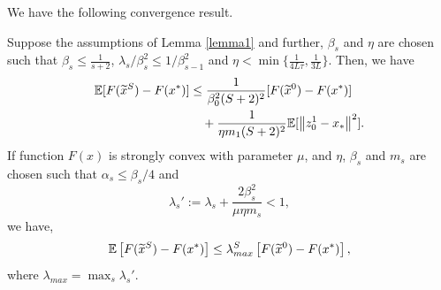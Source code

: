 We have the following convergence result.
\begin{theorem}\label{conve-theorem}
Suppose the assumptions of Lemma \ref{lemma1} and further, $\beta_s$ and $\eta$ are chosen such that $\beta_s\leq \frac{1}{s+2}$,  $\lambda_s/\beta_s^2 \leq 1/\beta_{s-1}^2$ and $\eta < \min\{\frac{1}{4L
\tau}, \frac{1}{3L}\}$. 
Then, we have
\begin{equation}
\begin{split}
{\mathbb{E}[F(\widetilde{x}^S)-F(x^*)]}&\leq \frac{1}{\beta_{0}^2(S+2)^2}[F(\widetilde{x}^{0})-F(x^*)] \\ 
&~~~ + {\frac{1}{\eta m_{1}(S+2)^2}}\mathbb{E}[\left\lVert z_{0}^1-x_*\right\rVert^2].
\end{split}
\end{equation}
If function $F(x)$ is strongly convex with parameter $\mu$, and $\eta$, $\beta_s$ and $m_s$ are chosen such that $\alpha_s\leq \beta_s/4$ and
\[
\lambda_s' := \lambda_s+{\frac{2 \beta_s^2}{\mu\eta m_s}} < 1,
\]
we have, 
\begin{equation}
\mathbb{E}\left[F(\widetilde{x}^S)-F(x^*)\right]\leq \lambda_{max}^S\left[F(\widetilde{x}^0)-F(x^*)\right],
\end{equation}
where $\lambda_{max} = \max_{s}{\lambda_s'}$.
\end{theorem}
